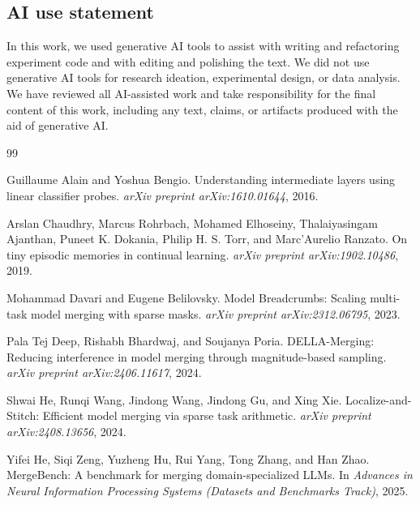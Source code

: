 \documentclass{article} %
\begin{document}
\subsection*{AI use statement}


In this work, we used generative AI tools to assist with writing and
refactoring experiment code and with editing and polishing the text. We did
not use generative AI tools for research ideation, experimental design, or
data analysis. We have reviewed all AI-assisted work and take responsibility
for the final content of this work, including any text, claims, or artifacts
produced with the aid of generative AI.

\begin{thebibliography}{99}

Guillaume Alain and Yoshua Bengio.
\newblock Understanding intermediate layers using linear classifier probes.
\newblock \emph{arXiv preprint arXiv:1610.01644}, 2016.

Arslan Chaudhry, Marcus Rohrbach, Mohamed Elhoseiny, Thalaiyasingam Ajanthan, Puneet K. Dokania, Philip H. S. Torr, and Marc'Aurelio Ranzato.
\newblock On tiny episodic memories in continual learning.
\newblock \emph{arXiv preprint arXiv:1902.10486}, 2019.

Mohammad Davari and Eugene Belilovsky.
\newblock Model Breadcrumbs: Scaling multi-task model merging with sparse masks.
\newblock \emph{arXiv preprint arXiv:2312.06795}, 2023.

Pala Tej Deep, Rishabh Bhardwaj, and Soujanya Poria.
\newblock DELLA-Merging: Reducing interference in model merging through magnitude-based sampling.
\newblock \emph{arXiv preprint arXiv:2406.11617}, 2024.

Shwai He, Runqi Wang, Jindong Wang, Jindong Gu, and Xing Xie.
\newblock Localize-and-Stitch: Efficient model merging via sparse task arithmetic.
\newblock \emph{arXiv preprint arXiv:2408.13656}, 2024.

Yifei He, Siqi Zeng, Yuzheng Hu, Rui Yang, Tong Zhang, and Han Zhao.
\newblock MergeBench: A benchmark for merging domain-specialized LLMs.
\newblock In \emph{Advances in Neural Information Processing Systems (Datasets and Benchmarks Track)}, 2025.


\end{thebibliography}
\end{document}
